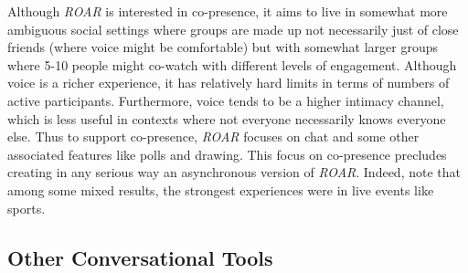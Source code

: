 Although \emph{ROAR} is interested in co-presence, it aims to live in somewhat more ambiguous social settings where groups are made up not necessarily just of close friends (where voice might be comfortable) but with somewhat larger groups where 5-10 people might co-watch with different levels of engagement. Although voice is a richer experience, it has relatively hard limits in terms of numbers of active participants. Furthermore, voice tends to be a higher intimacy channel, which is less useful in contexts where not everyone necessarily knows everyone else. Thus to support co-presence, \emph{ROAR} focuses on chat and some other associated features like polls and drawing. This focus on co-presence precludes creating in any serious way an asynchronous version of \emph{ROAR}. Indeed, \citet{uses.socialTV} note that among some mixed results, the strongest experiences were in live events like sports. 




% 	
% 	
% 
% 
% 
% 
% 
% 
% 
% 








\subsection{Other Conversational Tools}

